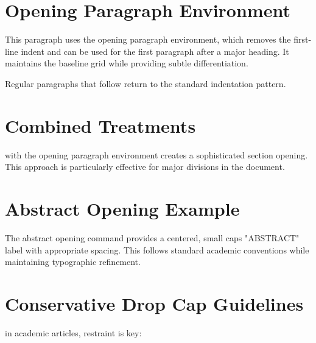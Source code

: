 \documentclass[11pt]{article}
\begin{document}
\section{Opening Paragraph Environment}

\begin{openingparagraph}
This paragraph uses the opening paragraph environment, which removes the first-line indent and can be used for the first paragraph after a major heading. It maintains the baseline grid while providing subtle differentiation.
\end{openingparagraph}

Regular paragraphs that follow return to the standard indentation pattern. \lipsum[5]

\section{Combined Treatments}

\begin{openingparagraph}
 with the opening paragraph environment creates a sophisticated section opening. This approach is particularly effective for major divisions in the document.
\end{openingparagraph}

\lipsum[6]

\section{Abstract Opening Example}

\abstractopening

\begin{openingparagraph}
The abstract opening command provides a centered, small caps "ABSTRACT" label with appropriate spacing. This follows standard academic conventions while maintaining typographic refinement.
\end{openingparagraph}

\clearpage
\section{Conservative Drop Cap Guidelines}

 in academic articles, restraint is key:
\end{document}
